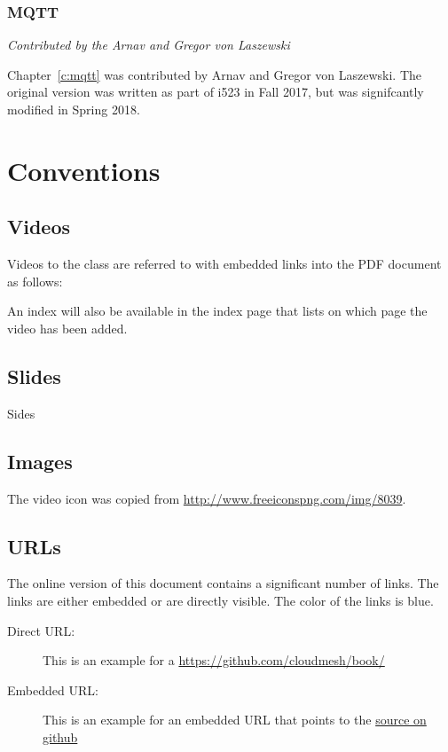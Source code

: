 \subsubsection{MQTT}

\textit{Contributed by the Arnav and Gregor von Laszewski}

Chapter~\ref{c:mqtt} was contributed by Arnav and Gregor von
Laszewski. The original version was written as part of i523 in Fall
2017, but was signifcantly modified in Spring 2018.

\section{Conventions}

\subsection{Videos}

Videos to the class are referred to with embedded links into the PDF
document as follows: 


An index will also be available in the index page
that lists on which page the video has been added.

\subsection{Slides}

Sides

\subsection{Images}

The video icon was copied from \url{http://www.freeiconspng.com/img/8039}.

\subsection{URLs}

The online version of this document contains a significant number of
links. The links are either embedded or are directly visible. The
color of the links is blue.

\begin{description}
\item[Direct URL:] This is an example for a
  \url{https://github.com/cloudmesh/book/}
\item[Embedded URL:] This is an example for an embedded URL that
  points to the \href{https://github.com/cloudmesh/book/}{source on github}
\end{description}

